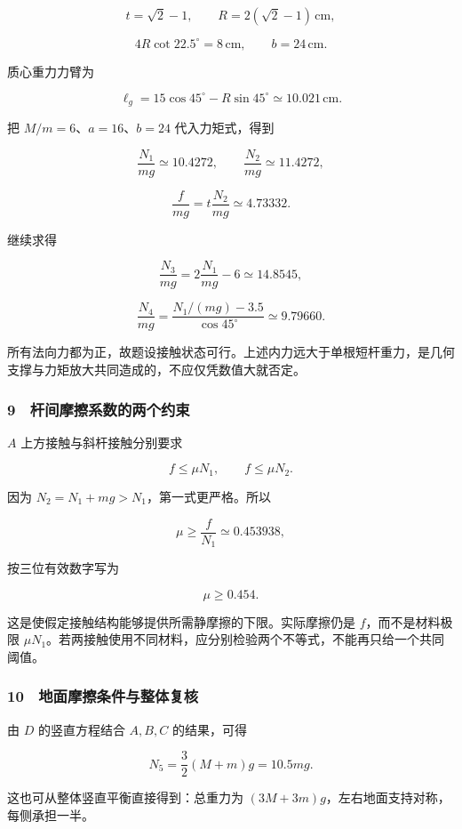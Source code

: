 \documentclass[12pt,a4paper,fontset=fandol]{ctexart}
\begin{document}
\[t=\sqrt2-1,\qquad
R=2(\sqrt2-1)\,\mathrm{cm},\]

\[4R\cot22.5^\circ=8\,\mathrm{cm},\qquad b=24\,\mathrm{cm}.\]

质心重力力臂为

\[\ell_g=15\cos45^\circ-R\sin45^\circ
\simeq10.021\,\mathrm{cm}.\]

把 \(M/m=6\)、\(a=16\)、\(b=24\) 代入力矩式，得到

\[\frac{N_1}{mg}\simeq10.4272,\qquad
\frac{N_2}{mg}\simeq11.4272,\]

\[\frac f{mg}=t\frac{N_2}{mg}\simeq4.73332.\]

继续求得

\[\frac{N_3}{mg}=2\frac{N_1}{mg}-6\simeq14.8545,\]

\[\frac{N_4}{mg}=
\frac{N_1/(mg)-3.5}{\cos45^\circ}\simeq9.79660.\]

所有法向力都为正，故题设接触状态可行。上述内力远大于单根短杆重力，是几何支撑与力矩放大共同造成的，不应仅凭数值大就否定。

\subsubsection{9　杆间摩擦系数的两个约束}\label{ux6746ux95f4ux6469ux64e6ux7cfbux6570ux7684ux4e24ux4e2aux7ea6ux675f}

\(A\) 上方接触与斜杆接触分别要求

\[f\le\mu N_1,\qquad f\le\mu N_2.\]

因为 \(N_2=N_1+mg>N_1\)，第一式更严格。所以

\[\mu\ge\frac f{N_1}\simeq0.453938,\]

按三位有效数字写为

\[\boxed{\mu\ge0.454.}\]

这是使假定接触结构能够提供所需静摩擦的下限。实际摩擦仍是
\(f\)，而不是材料极限
\(\mu N_1\)。若两接触使用不同材料，应分别检验两个不等式，不能再只给一个共同阈值。

\subsubsection{10　地面摩擦条件与整体复核}\label{ux5730ux9762ux6469ux64e6ux6761ux4ef6ux4e0eux6574ux4f53ux590dux6838}

由 \(D\) 的竖直方程结合 \(A,B,C\) 的结果，可得

\[N_5=\frac32(M+m)g=10.5mg.\]

这也可从整体竖直平衡直接得到：总重力为
\((3M+3m)g\)，左右地面支持对称，每侧承担一半。
\end{document}
